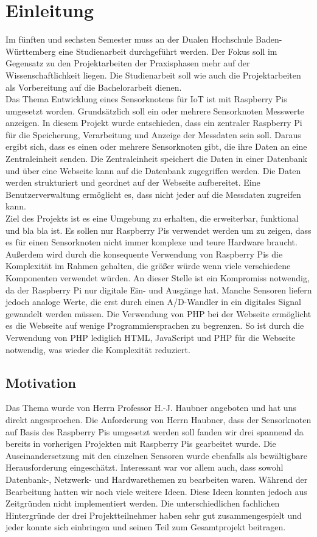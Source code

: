\chapter{Einleitung} 
Im fünften und sechsten Semester muss an der Dualen Hochschule Baden-Württemberg eine Studienarbeit durchgeführt werden. Der Fokus soll im Gegensatz zu den Projektarbeiten der Praxisphasen mehr auf der Wissenschaftlichkeit liegen. Die Studienarbeit soll wie auch die Projektarbeiten als Vorbereitung auf die Bachelorarbeit dienen. \\
Das Thema Entwicklung eines Sensorknotens für IoT ist mit Raspberry Pis umgesetzt worden. Grundsätzlich soll ein oder mehrere Sensorknoten Messwerte anzeigen. In diesem Projekt wurde entschieden, dass ein zentraler Raspberry Pi für die Speicherung, Verarbeitung und Anzeige der Messdaten sein soll. Daraus ergibt sich, dass es einen oder mehrere Sensorknoten gibt, die ihre Daten an eine Zentraleinheit senden. Die Zentraleinheit speichert die Daten in einer Datenbank und über eine Webseite kann auf die Datenbank zugegriffen werden. Die Daten werden strukturiert und geordnet auf der Webseite aufbereitet. Eine Benutzerverwaltung ermöglicht es, dass nicht jeder auf die Messdaten zugreifen kann.\\
Ziel des Projekts ist es eine Umgebung zu erhalten, die erweiterbar, funktional und bla bla ist. Es sollen nur Raspberry Pis verwendet werden um zu zeigen, dass es für einen Sensorknoten nicht immer komplexe und teure Hardware braucht. Außerdem wird durch die konsequente Verwendung von Raspberry Pis die Komplexität im Rahmen gehalten, die größer würde wenn viele verschiedene Komponenten verwendet würden. An dieser Stelle ist ein Kompromiss notwendig, da der Raspberry Pi nur digitale Ein- und Ausgänge hat. Manche Sensoren liefern jedoch analoge Werte, die erst durch einen \ac{A/D-Wandler} in ein digitales Signal gewandelt werden müssen. Die Verwendung von PHP bei der Webseite ermöglicht es die Webseite auf wenige Programmiersprachen zu begrenzen. So ist durch die Verwendung von PHP lediglich \ac{HTML}, JavaScript und \ac{PHP} für die Webseite notwendig, was wieder die Komplexität reduziert.

\section{Motivation}
Das Thema wurde von Herrn Professor H.-J. Haubner angeboten und hat uns direkt angesprochen. Die Anforderung von Herrn Haubner, dass der Sensorknoten auf Basis des Raspberry Pis umgesetzt werden soll fanden wir drei spannend da bereits in vorherigen Projekten mit Raspberry Pis gearbeitet wurde. Die Auseinandersetzung mit den einzelnen Sensoren wurde ebenfalls als bewältigbare Herausforderung eingeschätzt. Interessant war vor allem auch, dass sowohl Datenbank-, Netzwerk- und Hardwarethemen zu bearbeiten waren. Während der Bearbeitung hatten wir noch viele weitere Ideen. Diese Ideen konnten jedoch aus Zeitgründen nicht implementiert werden. Die unterschiedlichen fachlichen Hintergründe der drei Projektteilnehmer haben sehr gut zusammengespielt und jeder konnte sich einbringen und seinen Teil zum Gesamtprojekt beitragen.
